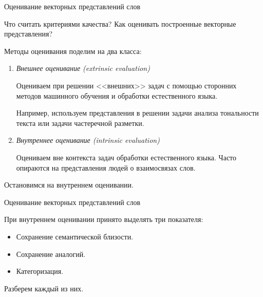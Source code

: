 \documentclass[9pt]{beamer}
\begin{document}
\begin{frame}{Оценивание векторных представлений слов}

Что считать критериями качества? Как оценивать построенные векторные представления?
\vspace{\baselineskip} 

Методы оценивания поделим на два класса:
\begin{enumerate}
    \item \textit{Внешнее оценивание (extrinsic evaluation)}
    \vspace{\baselineskip} 
    
    Оцениваем при решении <<внешних>> задач с помощью сторонних методов машинного обучения и обработки естественного языка.
    
    Например, используем представления в решении задачи анализа тональности текста или задачи частеречной разметки.
    \vspace{\baselineskip} 
    
    \item \textit{Внутреннее оценивание (intrinsic evaluation)}
    \vspace{\baselineskip} 
    
    Оцениваем вне контекста задач обработки естественного языка. Часто опираются на представления людей о взаимосвязах слов.
\end{enumerate}

\vspace{\baselineskip} 
Остановимся на внутреннем оценивании.
    
\end{frame}

\begin{frame}{Оценивание векторных представлений слов}

При внутреннем оценивании принято выделять три показателя:

\begin{itemize}
    \item Сохранение семантической близости.
    \item Сохранение аналогий.
    \item Категоризация.
\end{itemize}

\vspace{\baselineskip}
Разберем каждый из них.
    
\end{frame}
\end{document}
